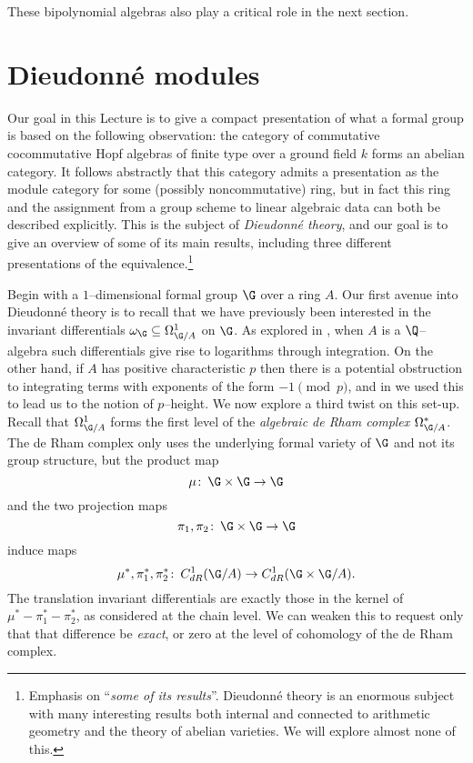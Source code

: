 These bipolynomial algebras also play a critical role in the next section.









\section{Dieudonn\'e modules}\label{SectionDieudonneModules}

Our goal in this Lecture is to give a compact presentation of what a formal group is based on the following observation: the category of commutative cocommutative Hopf algebras of finite type over a ground field $k$ forms an abelian category.  It follows abstractly that this category admits a presentation as the module category for some (possibly noncommutative) ring, but in fact this ring and the assignment from a group scheme to linear algebraic data can both be described explicitly.  This is the subject of \textit{Dieudonn\'e theory}, and our goal is to give an overview of some of its main results, including three different presentations of the equivalence.\footnote{Emphasis on ``\emph{some of its results}''.  Dieudonn\'e theory is an enormous subject with many interesting results both internal and connected to arithmetic geometry and the theory of abelian varieties.  We will explore almost none of this.}

Begin with a $1$--dimensional formal group $\G$ over a ring $A$.  Our first avenue into Dieudonn\'e theory is to recall that we have previously been interested in the invariant differentials $\omega_{\G} \subseteq \Omega^1_{\G/A}$ on $\G$.  As explored in , when $A$ is a $\Q$--algebra such differentials give rise to logarithms through integration.  On the other hand, if $A$ has positive characteristic $p$ then there is a potential obstruction to integrating terms with exponents of the form $-1 \pmod p$, and in  we used this to lead us to the notion of $p$--height.  We now explore a third twist on this set-up.  Recall that $\Omega^1_{\G/A}$ forms the first level of the \textit{algebraic de Rham complex} $\Omega^*_{\G/A}$.  The de Rham complex only uses the underlying formal variety of $\G$ and not its group structure, but the product map \[\mu\co \G \times \G \to \G\] and the two projection maps \[\pi_1, \pi_2\co \G \times \G \to \G\] induce maps \[\mu^*, \pi_1^*, \pi_2^*\co C_{dR}^1(\G/A) \to C_{dR}^1(\G \times \G / A).\]  The translation invariant differentials are exactly those in the kernel of $\mu^* - \pi_1^* - \pi_2^*$, as considered at the chain level.  We can weaken this to request only that that difference be \emph{exact}, or zero at the level of cohomology of the de Rham complex.

